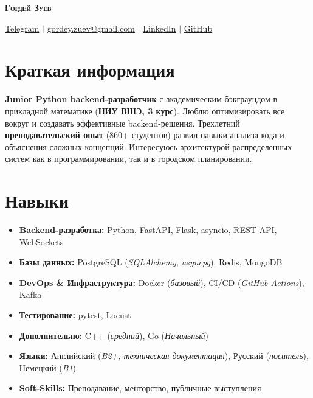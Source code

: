 \documentclass[letterpaper,11pt]{article}
\begin{document}
\begin{center}
    \textsc{\Huge{\textbf{Гордей Зуев}}} \\ \vspace{1pt}
    
    \href{{https://t.me/gordeyzuev}}{\textcolor{blue!50!black}{Telegram}} $|$
    \href{mailto:gordey.zuev@gmail.com}{\textcolor{blue!50!black} {gordey.zuev@gmail.com}} $|$
    \href{{https://www.linkedin.com/in/gordey-zuev/}}{\textcolor{blue!50!black}{LinkedIn}} $|$
    \href{https://github.com/GordeyZuev}{\textcolor{blue!50!black}{GitHub}} 
\end{center}


\section{Краткая информация}
 \begin{itemize}[leftmargin=0.15in, label={}]
    \small{\item{
     {\textbf{Junior Python backend-разработчик} с академическим бэкграундом в прикладной математике (\textbf{НИУ ВШЭ, 3 курс}). Люблю оптимизировать все вокруг и создавать эффективные backend-решения. Трехлетний \textbf{преподавательский опыт} (860+ студентов) развил навыки анализа кода и объяснения сложных концепций. Интересуюсь архитектурой распределенных систем как в программировании, так и в городском планировании.
     }
    }}
 \end{itemize}


 \section{Навыки}
\begin{itemize}[leftmargin=0.15in, label={}, nosep]
    \small
    \item \textbf{Backend-разработка:} 
          Python, FastAPI, Flask, asyncio, REST API, WebSockets
    
    \item \textbf{Базы данных:} 
          PostgreSQL (\textit{SQLAlchemy, asyncpg}), 
          Redis, 
          MongoDB
    
    \item \textbf{DevOps \& Инфраструктура:} 
          Docker (\textit{базовый}), 
          CI/CD (\textit{GitHub Actions}), 
          Kafka
    
    \item \textbf{Тестирование:} 
          pytest, Locust
    
    \item \textbf{Дополнительно:} 
           C++ (\textit{средний}), Go (\textit{Начальный})
    
    \item \textbf{Языки:} 
          Английский (\textit{B2+, техническая документация}), 
          Русский (\textit{носитель}),
          Немецкий (\textit{B1})

    \item \textbf{Soft-Skills:}
        Преподавание,
        менторство,
        публичные выступления
    
\end{itemize}
\end{document}
